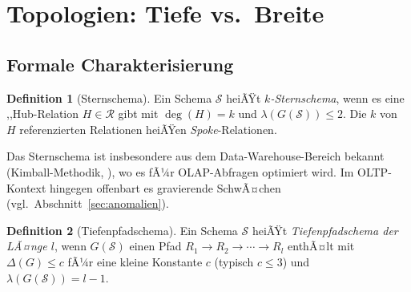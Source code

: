 ﻿\documentclass[a4paper,12pt]{report}
\theoremstyle{definition}
\newtheorem{definition}{Definition}[chapter]
\theoremstyle{remark}
\begin{document}
\section{Topologien: Tiefe vs.\ Breite}
\label{sec:topologien}

\subsection{Formale Charakterisierung}

\begin{definition}[Sternschema]
\label{def:stern}
Ein Schema $\mathcal{S}$ heiÃŸt \emph{$k$-Sternschema}, wenn es eine
,,Hub\grqq{}-Relation $H \in \mathcal{R}$ gibt mit $\deg(H) = k$ und
$\lambda(G(\mathcal{S})) \leq 2$. Die $k$ von $H$ referenzierten Relationen
heiÃŸen \emph{Spoke}-Relationen.
\end{definition}

Das Sternschema ist insbesondere aus dem Data-Warehouse-Bereich bekannt
(Kimball-Methodik, \cite{Kimball1996}), wo es fÃ¼r OLAP-Abfragen optimiert
wird. Im OLTP-Kontext hingegen offenbart es gravierende SchwÃ¤chen
(vgl.\ Abschnitt~\ref{sec:anomalien}).

\begin{definition}[Tiefenpfadschema]
\label{def:tiefenpfad}
Ein Schema $\mathcal{S}$ heiÃŸt \emph{Tiefenpfadschema der LÃ¤nge $l$},
wenn $G(\mathcal{S})$ einen Pfad $R_1 \to R_2 \to \cdots \to R_l$
enthÃ¤lt mit $\Delta(G) \leq c$ fÃ¼r eine kleine Konstante $c$ (typisch $c \leq 3$)
und $\lambda(G(\mathcal{S})) = l - 1$.
\end{definition}
\end{document}
